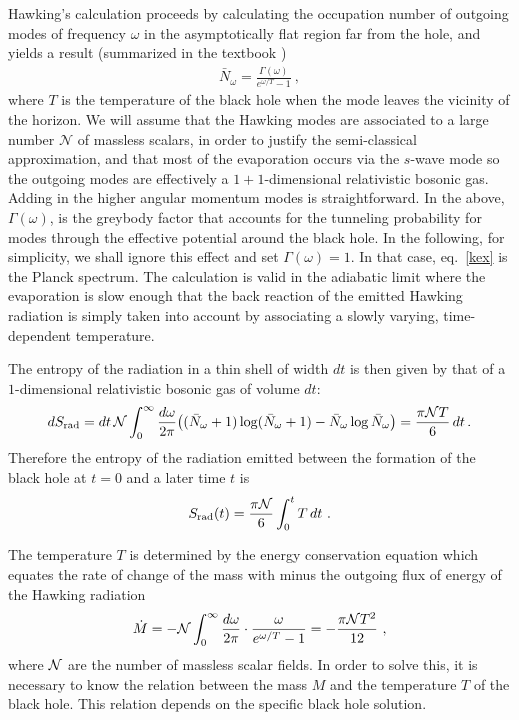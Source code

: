 \documentclass[12pt]{article}
\newcommand{\EQ}[1]{\begin{equation}\begin{split} #1
\end{split}\end{equation}}
\begin{document}
Hawking's calculation proceeds by calculating the occupation number of outgoing modes of frequency $\omega$ in the asymptotically flat region far from the hole, and yields a result \cite{Hawking:1974sw,Hawking:1976ra} (summarized in the textbook \cite{BD})
\EQ{
\bar N_\omega=\frac{\Gamma(\omega)}{e^{\omega/T}-1}\ ,
\label{kex}
}
where $T$ is the temperature of the black hole when the mode leaves the vicinity of the horizon. We will assume that the Hawking modes are associated to a large number $\mathcal{N}$ of massless scalars, in order to justify the  semi-classical approximation, and that most of the evaporation occurs via the $s$-wave mode so the outgoing modes are effectively a $1+1$-dimensional relativistic bosonic gas. Adding in the higher angular momentum modes is straightforward. In the above, $\Gamma(\omega)$, is the greybody factor that accounts for the tunneling probability for modes through the effective potential around the black hole. In the following, for simplicity, we shall ignore this effect and set $\Gamma(\omega)=1$. In that case, eq.~\eqref{kex} is the Planck spectrum.  The calculation is valid in the adiabatic limit where the evaporation is slow enough that the back reaction of the emitted Hawking radiation is simply taken into account by associating a slowly varying, time-dependent temperature. 

The entropy of the radiation in a thin shell of width $dt$ is then given by that of a $1$-dimensional relativistic bosonic gas of volume $dt$:
\EQ{
dS_\text{rad}=dt\,{\cal N}\int_0^\infty\frac{d\omega}{2\pi}\big((\bar N_\omega+1)\log(\bar N_\omega+1)-\bar N_\omega\log\bar N_\omega\big)=\frac{\pi {\cal N}T}6\,dt\,.
\label{hxx}
}
Therefore  the entropy of the radiation emitted between the formation of the black hole at $t=0$ and a later time $t$ is
\EQ{
S_\text{rad}(t)=\frac{\pi {\cal N}}6\int_0^tT\,dt\ .
\label{dup}
}

The temperature $T$ is determined by the energy conservation equation which equates the rate of change of the mass with minus  the outgoing flux of energy of the Hawking radiation 
\EQ{
\dot M=-{\cal N}\int_0^\infty\frac{d\omega}{2\pi}\cdot\frac{\omega}{e^{\omega/T}-1}=-\frac{\pi{\cal N}T^2}{12}\ ,
\label{her}
}
where ${\cal N}$ are the number of massless scalar fields. In order to solve this, it is necessary to know the relation between the mass $M$ and the temperature $T$ of the black hole. This relation depends on the  specific black hole solution. 
\end{document}
